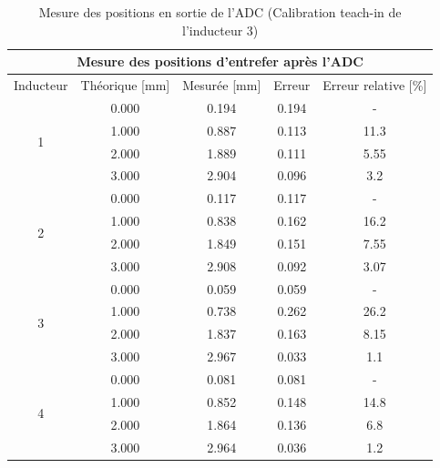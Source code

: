\begin{table}[H]
    \centering
    \begin{tabular}{|c|c|c|c|c|}
        \hline
        \multicolumn{5}{|c|}{\textbf{Mesure des positions d'entrefer après l'ADC}}                     \\ \hline
        Inducteur          & Théorique {[}mm{]} & Mesurée {[}mm{]} & Erreur & Erreur relative {[}\%{]} \\ \hline
        \multirow{4}{*}{1} & 0.000              & 0.194            & 0.194  & -                        \\ \cline{2-5}
                           & 1.000              & 0.887            & 0.113  & 11.3                     \\ \cline{2-5}
                           & 2.000              & 1.889            & 0.111  & 5.55                     \\ \cline{2-5}
                           & 3.000              & 2.904            & 0.096  & 3.2                      \\ \hline
        \multirow{4}{*}{2} & 0.000              & 0.117            & 0.117  & -                        \\ \cline{2-5}
                           & 1.000              & 0.838            & 0.162  & 16.2                     \\ \cline{2-5}
                           & 2.000              & 1.849            & 0.151  & 7.55                     \\ \cline{2-5}
                           & 3.000              & 2.908            & 0.092  & 3.07                     \\ \hline
        \multirow{4}{*}{3} & 0.000              & 0.059            & 0.059  & -                        \\ \cline{2-5}
                           & 1.000              & 0.738            & 0.262  & 26.2                     \\ \cline{2-5}
                           & 2.000              & 1.837            & 0.163  & 8.15                     \\ \cline{2-5}
                           & 3.000              & 2.967            & 0.033  & 1.1                      \\ \hline
        \multirow{4}{*}{4} & 0.000              & 0.081            & 0.081  & -                        \\ \cline{2-5}
                           & 1.000              & 0.852            & 0.148  & 14.8                     \\ \cline{2-5}
                           & 2.000              & 1.864            & 0.136  & 6.8                      \\ \cline{2-5}
                           & 3.000              & 2.964            & 0.036  & 1.2                      \\ \hline
    \end{tabular}
    \caption{Mesure des positions en sortie de l'ADC (Calibration teach-in de l'inducteur 3)}
    \label{tab:teachin_3_adc}
\end{table}

